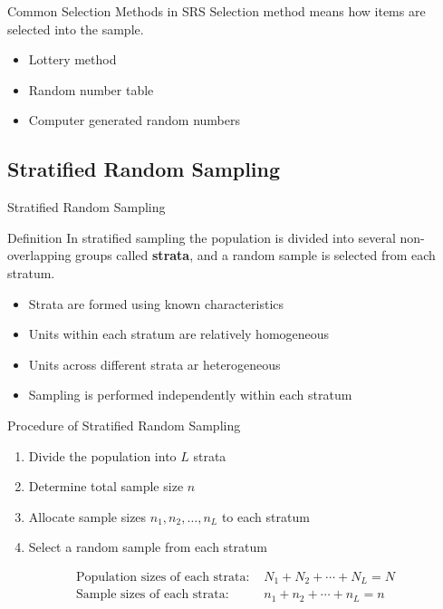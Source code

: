 \documentclass[12pt, aspectratio=169]{beamer}
\begin{document}
    \begin{frame}{Common Selection Methods in SRS}
        Selection method means how items are selected into the sample.
        \begin{itemize}
            \item Lottery method
            \item Random number table
            \item Computer generated random numbers
        \end{itemize}
    \end{frame}


    \subsection{Stratified Random Sampling}

    \begin{frame}{Stratified Random Sampling}
        \begin{block}{Definition}
            In stratified sampling the population is divided into several non-overlapping groups called \textbf{strata}, and a random sample is selected from each stratum.
        \end{block}

        \begin{itemize}
            \item Strata are formed using known characteristics

            \item Units within each stratum are relatively homogeneous
            
            \item Units across different strata ar heterogeneous

            \item Sampling is performed independently within each stratum
        \end{itemize}
    \end{frame}


    \begin{frame}{Procedure of Stratified Random Sampling}
        \begin{enumerate}
            \item Divide the population into $L$ strata

            \item Determine total sample size $n$

            \item Allocate sample sizes $n_1, n_2, \dots, n_L$ to each stratum

            \item Select a random sample from each stratum
        \end{enumerate}

        \begin{align*}
            \text{Population sizes of each strata: } & N_1 + N_2 + \cdots + N_L = N \\
            \text{Sample sizes of each strata: } & n_1 + n_2 + \cdots + n_L = n
        \end{align*}
    \end{frame}
\end{document}
